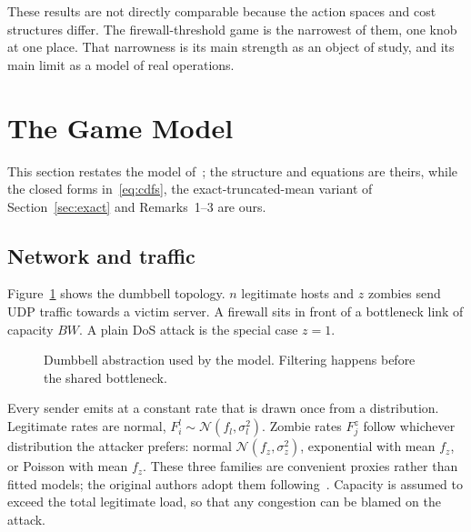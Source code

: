\documentclass[conference]{IEEEtran}
\begin{document}
These results are not directly comparable because the action spaces and cost structures differ. The firewall-threshold game is the narrowest of them, one knob at one place. That narrowness is its main strength as an object of study, and its main limit as a model of real operations.

\section{The Game Model}\label{sec:model}
This section restates the model of~\cite{spyridopoulos2013}; the structure and equations are theirs, while the closed forms in~\eqref{eq:cdfs}, the exact-truncated-mean variant of Section~\ref{sec:exact} and Remarks~1--3 are ours.

\subsection{Network and traffic}
Figure~\ref{fig:topo} shows the dumbbell topology. $n$ legitimate hosts and $z$ zombies send UDP traffic towards a victim server. A firewall sits in front of a bottleneck link of capacity $BW$. A plain DoS attack is the special case $z{=}1$.

\begin{figure}[t]
\centering
{}
\caption{Dumbbell abstraction used by the model. Filtering happens before the shared bottleneck.}
\label{fig:topo}
\end{figure}

Every sender emits at a constant rate that is drawn once from a distribution. Legitimate rates are normal, $F^l_i\sim\mathcal N(f_l,\sigma_l^2)$. Zombie rates $F^z_j$ follow whichever distribution the attacker prefers: normal $\mathcal N(f_z,\sigma_z^2)$, exponential with mean $f_z$, or Poisson with mean $f_z$. These three families are convenient proxies rather than fitted models; the original authors adopt them following~\cite{wu2010}. Capacity is assumed to exceed the total legitimate load, so that any congestion can be blamed on the attack.
\end{document}
